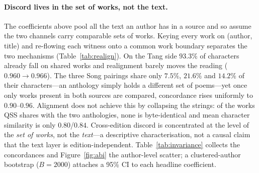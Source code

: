 \documentclass[10pt]{article}
\begin{document}
\paragraph{Discord lives in the set of works, not the text.} The coefficients above
pool all the text an author has in a source and so assume the two channels carry
comparable sets of works. Keying every work on (author, title) and re-flowing each
witness onto a common work boundary separates the two mechanisms
(Table~\ref{tab:realign}). On the Tang side $93.3\%$ of characters already fall on
shared works and realignment barely moves the reading ($0.960\to0.966$). The three
Song pairings share only $7.5\%$, $21.6\%$ and $14.2\%$ of their characters---an
anthology simply holds a different set of poems---yet once only works present in both
sources are compared, concordance rises uniformly to $0.90$--$0.96$. Alignment does
not achieve this by collapsing the strings: of the works QSS shares with the two
anthologies, none is byte-identical and mean character similarity is only
$0.80$/$0.84$. Cross-edition discord is concentrated at the level of the \emph{set of
works}, not the \emph{text}---a descriptive characterisation, not a causal claim that
the text layer is edition-independent. Table~\ref{tab:invariance} collects the
concordances and Figure~\ref{fig:abi} the author-level scatter; a clustered-author
bootstrap ($B{=}2000$) attaches a 95\% CI to each headline coefficient.
\end{document}
